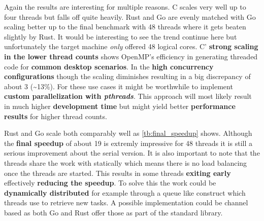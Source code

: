 Again the results are interesting for multiple reasons. C scales very well up to four threads but falls off quite heavily. Rust and Go are evenly matched with Go scaling better up to the final benchmark with 48 threads where it gets beaten slightly by Rust. It would be interesting to see the trend continue here but unfortunately the target machine \textit{only} offered 48 logical cores. C' \textbf{strong scaling in the lower thread counts} shows OpenMP's efficiency in generating threaded code for \textbf{common desktop scenarios}. In the \textbf{high concurrency configurations} though the scaling diminishes resulting in a big discrepancy of about 3 (\textasciitilde13\%). For these use cases it might be worthwhile to implement \textbf{custom parallelization with \textit{pthreads}}. This approach will most likely result in much higher \textbf{development time} but might yield better \textbf{performance results} for higher thread counts.

Rust and Go scale both comparably well as \autoref{tb:final_speedup} shows. Although the \textbf{final speedup} of about 19 is extremly impressive for 48 threads it is still a serious improvement about the serial version. It is also important to note that the threads share the work with statically which means there is no load balancing once the threads are started. This results in some threads \textbf{exiting early} effectively \textbf{reducing the speedup}. To solve this the work could be \textbf{dynamically distributed} for example through a queue like construct which threads use to retrieve new tasks. A possible implementation could be channel based as both Go and Rust offer those as part of the standard library.

